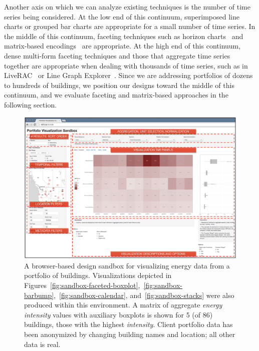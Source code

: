 \documentclass[journal]{vgtc}                %
\begin{document}
Another axis on which we can analyze existing techniques is the number of time series being considered.
At the low end of this continuum, superimposed line charts or grouped bar charts are appropriate for a small number of time series. 
In the middle of this continuum, faceting techniques such as horizon charts~\cite{Heer2009} and matrix-based encodings~\cite{Hao2007,Shimabukuro2004} are appropriate.
At the high end of this continuum, dense multi-form faceting techniques and those that aggregate time series together are appropriate when dealing with thousands of time series, such as in LiveRAC~\cite{McLachlan2008} or Line Graph Explorer~\cite{Lam2007}. 
Since we are addressing portfolios of dozens to hundreds of buildings, we position our designs toward the middle of this continuum, and we evaluate faceting and matrix-based approaches in the following section.

\begin{figure}[ht]
	\centering
	\includegraphics[width=\textwidth]{figures/sandbox.pdf}
	\vspace{-0.6cm}
	\caption{A browser-based design sandbox for visualizing energy data from a portfolio of buildings. Visualizations depicted in Figures~\ref{fig:sandbox-faceted-boxplot},~\ref{fig:sandbox-barbump},~\ref{fig:sandbox-calendar}, and~\ref{fig:sandbox-stacks} were also produced within this environment. A matrix of aggregate \textsl{energy intensity} values with auxiliary boxplots is shown for 5 (of 86) buildings, those with the highest \textsl{intensity}.
	Client portfolio data has been anonymized by changing building names and location; all other data is real.}
	\label{fig:sandbox}
	\vspace{-0.6cm}
\end{figure} 
\end{document}

